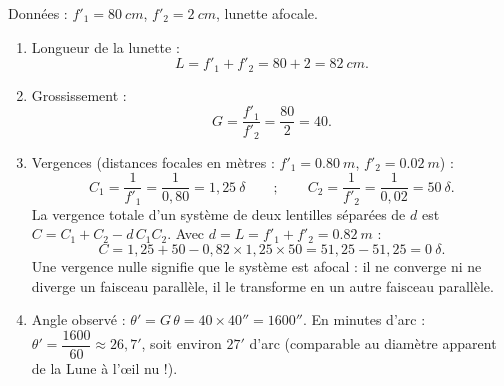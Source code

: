 \documentclass[11pt]{article}
\begin{document}
\begin{corrige}
Données : $f'_1 = \SI{80}{cm}$, $f'_2 = \SI{2}{cm}$, lunette afocale.
\begin{enumerate}
\item Longueur de la lunette :
\[ L = f'_1 + f'_2 = 80 + 2 = \SI{82}{cm}. \]
\item Grossissement :
\[ G = \dfrac{f'_1}{f'_2} = \dfrac{80}{2} = 40. \]
\item Vergences (distances focales en mètres : $f'_1 = \SI{0,80}{m}$, $f'_2 = \SI{0,02}{m}$) :
\[ C_1 = \dfrac{1}{f'_1} = \dfrac{1}{0{,}80} = 1{,}25\ \delta \qquad ; \qquad C_2 = \dfrac{1}{f'_2} = \dfrac{1}{0{,}02} = 50\ \delta. \]
La vergence totale d'un système de deux lentilles séparées de $d$ est $C = C_1 + C_2 - d\,C_1C_2$. Avec $d = L = f'_1 + f'_2 = \SI{0,82}{m}$ :
\[ C = 1{,}25 + 50 - 0{,}82 \times 1{,}25 \times 50 = 51{,}25 - 51{,}25 = 0\ \delta. \]
Une vergence nulle signifie que le système est afocal : il ne converge ni ne diverge un faisceau parallèle, il le transforme en un autre faisceau parallèle.
\item Angle observé : $\theta' = G\,\theta = 40 \times 40'' = 1600''$.
En minutes d'arc : $\theta' = \dfrac{1600}{60} \approx 26{,}7'$, soit environ $27'$ d'arc (comparable au diamètre apparent de la Lune à l'œil nu !).
\end{enumerate}
\end{corrige}
\end{document}
